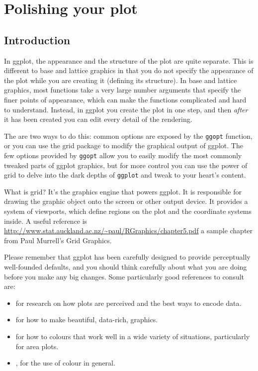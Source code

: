 

\chapter{Polishing your plot}

\section{Introduction}

In ggplot, the appearance and the structure of the plot are quite separate.  This is different to base and lattice graphics in that you do not specify the appearance of the plot while you are creating it (defining its structure).  In base and lattice graphics, most functions take a very large number arguments that specify the finer points of appearance, which can make the functions complicated and hard to understand.  Instead, in ggplot you create the plot in one step, and then {\em after} it has been created you can edit every detail of the rendering.  

The are two ways to do this: common options are exposed by the {\tt ggopt} function, or you can use the grid package to modify the graphical output of ggplot.  The few options provided by {\tt ggopt} allow you to easily modify the most commonly tweaked parts of ggplot graphics, but for more control you can use the power of grid to delve into the dark depths of {\tt ggplot} and tweak to your heart's content.

What is grid?  It's the graphics engine that powers ggplot.  It is responsible for drawing the graphic object onto the screen or other output device.  It provides a system of viewports, which define regions on the plot and the coordinate systems inside.  A useful reference is \url{http://www.stat.auckland.ac.nz/~paul/RGraphics/chapter5.pdf} a sample chapter from Paul Murrell's Grid Graphics.

Please remember that ggplot has been carefully designed to provide perceptually well-founded defaults, and you should think carefully about what you are doing before you make any big changes.  Some particularly good references to consult are:

\begin{itemize}
	\item \citet{cleveland:1993,cleveland:1987,cleveland:1994} for research on how plots are perceived and the best ways to encode data.
	\item \citet{tufte:2006,tufte:1990,tufte:1997,tufte:2001} for how to make beautiful, data-rich, graphics.
	\item \citet{brewer:1994,brewer:1994a} for how to colours that work well in a wide variety of situations, particularly for area plots.
	\item \citet{carr:1999,carr:1994,carr:2002}, for the use of colour in general.
\end{itemize}

